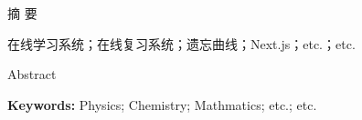 \pagestyle{empty}

{}

{\begin{center}\heiti\xiaosan\mdseries 摘 \quad 要\end{center}}

\lipsum[1-3]

\vspace{1ex}
在线学习系统；在线复习系统；遗忘曲线；Next.js；etc.；etc.
\clearpage

{}

{\begin{center}\xiaosan\mdseries Abstract\end{center}}

\lipsum[4-6]

\vspace{1ex}
\noindent\textbf{Keywords: }Physics; Chemistry; Mathmatics; etc.; etc.
\clearpage